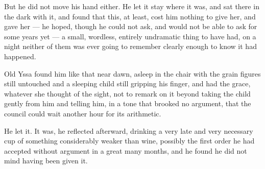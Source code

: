 But he did not move his hand either. He let it stay where it was, and sat there in the dark with it, and found that this, at least, cost him nothing to give her, and gave her — he hoped, though he could not ask, and would not be able to ask for some years yet — a small, wordless, entirely undramatic thing to have had, on a night neither of them was ever going to remember clearly enough to know it had happened.

Old Yssa found him like that near dawn, asleep in the chair with the grain figures still untouched and a sleeping child still gripping his finger, and had the grace, whatever she thought of the sight, not to remark on it beyond taking the child gently from him and telling him, in a tone that brooked no argument, that the council could wait another hour for its arithmetic.

He let it. It was, he reflected afterward, drinking a very late and very necessary cup of something considerably weaker than wine, possibly the first order he had accepted without argument in a great many months, and he found he did not mind having been given it.
